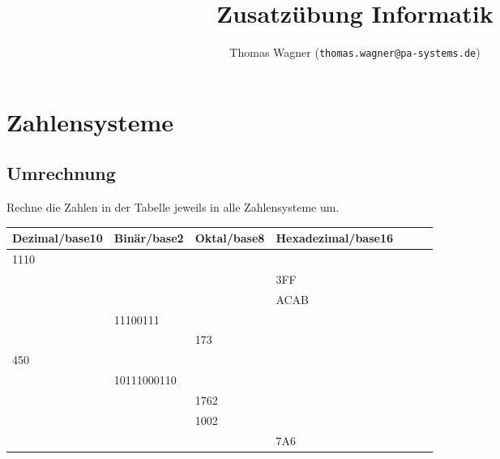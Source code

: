 \documentclass[]{scrartcl}
\title{Zusatzübung Informatik}
\author{Thomas Wagner (\texttt{thomas.wagner@pa-systems.de})}
\begin{document}
\lstset{style=CStyle}

\maketitle

\section{Zahlensysteme}

\subsection{Umrechnung}
Rechne die Zahlen in der Tabelle jeweils in alle Zahlensysteme um.

\begin{table}[h!]
	\centering
	\begin{tabular}{l|l|l|llll}
		\multicolumn{1}{c|}{\textbf{Dezimal/base10}} &
		\multicolumn{1}{c|}{\textbf{Binär/base2}} &
		\multicolumn{1}{c|}{\textbf{Oktal/base8}} &
		\multicolumn{1}{c}{\textbf{Hexadezimal/base16}} &
		\multicolumn{1}{c}{\textbf{}} &
		\multicolumn{1}{c}{\textbf{}} &
		\multicolumn{1}{c}{\textbf{}} \\ \hline
		1110 &             &      &      &  &  &  \\ \hline
		     &             &      & 3FF  &  &  &  \\ \hline
		  	 &             &      & ACAB &  &  &  \\ \hline
		     & 11100111    &      &      &  &  &  \\ \hline
		     &             & 173  &      &  &  &  \\ \hline
		450  &             &      &      &  &  &  \\ \hline
		     & 10111000110 &      &      &  &  &  \\ \hline
		     &             & 1762 &      &  &  &  \\ \hline
		     &             & 1002 &      &  &  &  \\ \hline
		     &             &      & 7A6  &  &  &
	\end{tabular}
\end{table}
\end{document}
